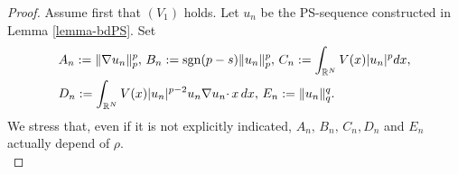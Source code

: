 \documentclass[11pt,reqno]{amsart}
\theoremstyle{definition}
\numberwithin{equation}{section}
\numberwithin{theorem}{section}
\numberwithin{equation}{section}
\numberwithin{theorem}{section}
\newcommand{\rn}{\mathbb{R}^N}
\begin{document}
\begin{proof}
Assume first that $(V_1)$ holds. Let $u_n$ be the PS-sequence  constructed in Lemma \ref{lemma-bdPS}. Set
\begin{equation}
\begin{aligned}
&A_n:=\|\nabla u_n\|_p^p,\,B_n:={\rm sgn}(p-s)\|u_n\|^p_p,\,C_n:=\int_{\rn}V(x)|u_n|^pdx,\\
&D_n:=\int_{\rn}V(x)|u_n|^{p-2}u_n\nabla u_n\cdotp x\, dx,\, E_n:=\|u_n\|_q^q.    
\end{aligned}
\end{equation}
We stress that, even if it is not explicitly indicated, $A_n,\, B_n,\, C_n,D_n$ and $E_n$ actually depend of $\rho$. \\


\end{proof}
\end{document}
